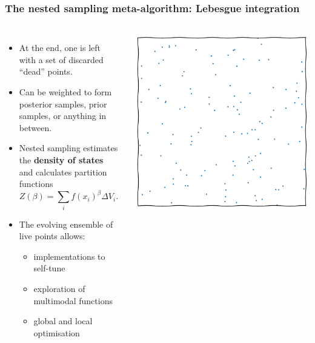 \documentclass[aspectratio=169]{beamer}
\begin{document}
\begin{frame}
    \frametitle{The nested sampling meta-algorithm: Lebesgue integration}
    \begin{columns}
        \begin{itemize}
            \item At the end, one is left with a set of discarded ``dead'' points.
            \item Can be weighted to form posterior samples, prior samples, or anything in between.
            \item Nested sampling estimates the \textbf{density of states} and calculates partition functions
                \[Z(\beta) = \sum_i f(x_i)^\beta \Delta V_i.\]
            \item The evolving ensemble of live points allows:
                \begin{itemize}
                    \item implementations to self-tune
                    \item exploration of multimodal functions
                    \item global and local optimisation
                \end{itemize}
        \end{itemize}
        \includegraphics[width=\textwidth,page=14]{figures/himmelblau}%

\end{columns}
\end{frame}
\end{document}
